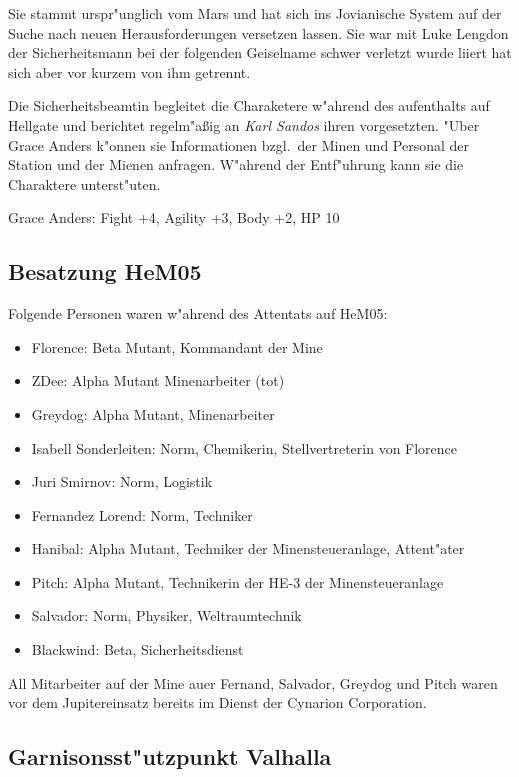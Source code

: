 Sie stammt urspr"unglich vom Mars und hat sich ins Jovianische System auf der Suche nach neuen Herausforderungen versetzen lassen. Sie war mit Luke Lengdon der Sicherheitsmann bei der folgenden Geiselname schwer verletzt wurde liiert hat sich aber vor kurzem von ihm getrennt.

Die Sicherheitsbeamtin begleitet die Charaketere w"ahrend des aufenthalts auf Hellgate und berichtet regelm"aßig an \emph{Karl Sandos} ihren vorgesetzten. "Uber Grace Anders k"onnen sie Informationen bzgl.~der Minen und Personal der Station und der Mienen anfragen. W"ahrend der Entf"uhrung kann sie die Charaktere unterst"uten.

Grace Anders: Fight +4, Agility +3, Body +2, HP 10

\subsection{Besatzung HeM05}

Folgende Personen waren w"ahrend des Attentats auf HeM05:

\begin{itemize}
    \item Florence: Beta Mutant, Kommandant der Mine    
    \item ZDee: Alpha Mutant Minenarbeiter (tot)
    \item Greydog: Alpha Mutant, Minenarbeiter
    \item Isabell Sonderleiten: Norm, Chemikerin, Stellvertreterin von Florence
    \item Juri Smirnov: Norm, Logistik
    \item Fernandez Lorend: Norm, Techniker
    \item Hanibal: Alpha Mutant, Techniker der Minensteueranlage, Attent"ater
    \item Pitch: Alpha Mutant, Technikerin der HE-3 der Minensteueranlage
    \item Salvador: Norm, Physiker, Weltraumtechnik
    \item Blackwind: Beta, Sicherheitsdienst
\end{itemize}

All Mitarbeiter auf der Mine au\3er Fernand, Salvador, Greydog und Pitch waren vor dem Jupitereinsatz bereits im Dienst der Cynarion Corporation.

\subsection{Garnisonsst"utzpunkt Valhalla}

